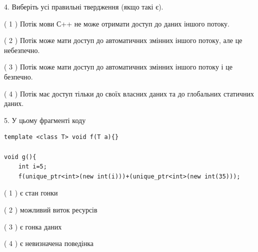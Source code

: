 \documentclass[12pt, ukrainian]{article}
\begin{document}
\begin {large}
{%
4. Виберіть усі правильні твердження (якщо такі є).\par
\vspace{2mm}

( 1 ) Потік мови С++ не може отримати доступ до даних іншого потоку.%

( 2 ) Потік може мати доступ до автоматичних змінних іншого потоку, але це небезпечно.%

( 3 ) Потік може мати доступ до автоматичних змінних іншого потоку і це безпечно.%

( 4 ) Потік має доступ тільки до своїх власних даних та до глобальних статичних даних.%


5. У цьому фрагменті коду
\begin{verbatim}
template <class T> void f(T a){}

void g(){
    int i=5;
    f(unique_ptr<int>(new int(i)))+(unique_ptr<int>(new int(35)));
\end{verbatim}
( 1 ) є стан гонки%

( 2 ) можливий виток ресурсів%

( 3 ) є гонка даних%

( 4 ) є невизначена поведінка%
}
\end {large}
\end{document}
